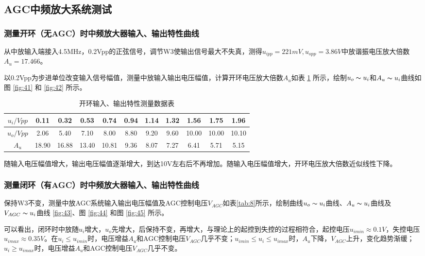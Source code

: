 \documentclass[UTF8]{ctexart}
\begin{document}
\subsection{AGC中频放大系统测试}
\subsubsection{测量开环（无AGC）时中频放大器输入、输出特性曲线}
从中放输入端接入4.5MHz，0.2Vpp的正弦信号，调节W3使输出信号最大不失真，测得$u_{ipp}=221mV,u_{opp}=3.86V$中放谐振电压放大倍数$A_u=17.466$。

以0.2Vpp为步进单位改变输入信号幅值，测量中放输入输出电压幅值，计算开环电压放大倍数$A_u$如表 \ref{tab:7} 所示，绘制$u_o\thicksim u_i$和$A_u\thicksim u_i$曲线如图 \ref{fig:41} 和 \ref{fig:42} 所示。
\begin{table}[H]
    \centering
    \caption{开环输入、输出特性测量数据表}
    \label{tab:7}
    \begin{tabular}{c|c|c|c|c|c|c|c|c|c|c}
    \hline
    $u_i/Vpp$ & 0.11  & 0.32  & 0.53  & 0.74  & 0.94 & 1.14 & 1.32 & 1.56  & 1.75  & 1.96  \\ \hline
    $u_o/Vpp$ & 2.06  & 5.40  & 7.10  & 8.00  & 8.80 & 9.20 & 9.60 & 10.00 & 10.00 & 10.10 \\ \hline
    $A_u$     & 18.90 & 16.88 & 13.40 & 10.81 & 9.36 & 8.07 & 7.27 & 6.41  & 5.71  & 5.15  \\ \hline
    \end{tabular}
\end{table}

随输入电压幅值增大，输出电压幅值逐渐增大，到达10V左右后不再增加。随输入电压幅值增大，开环电压放大倍数近似线性下降。
\subsubsection{测量闭环（有AGC）时中频放大器输入、输出特性曲线}
保持W3不变，测量中放AGC系统输入输出电压幅值及AGC控制电压$V_{AGC}$如表\ref{tab:8}所示，绘制曲线$u_o\thicksim u_i$曲线、$A_u\thicksim u_i$曲线及$V_{AGC}\thicksim u_i$曲线 \ref{fig:43}、图 \ref{fig:44} 和图 \ref{fig:45} 所示。

可以看出，闭环时中放随$u_i$增大，$u_o$先增大，后保持不变，再增大，与理论上的起控到失控的过程相符合，起控电压$u_{imin}\approx 0.1V$，失控电压$u_{imax}\approx 0.35V$。在$u_i\leq u_{imin}$时，电压增益$A_u$和AGC控制电压$V_{AGC}$几乎不变；$u_{imin}\leq u_i\leq u_{imax}$时，$A_u$下降，$V_{AGC}$上升，变化趋势渐缓；$u_i\geq u_{imax}$时，电压增益$A_u$和AGC控制电压$V_{AGC}$几乎不变。
\end{document}
